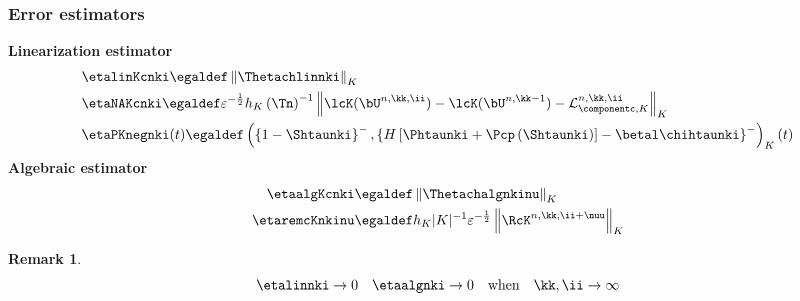\documentclass[10 pt]{beamer}
\newtheorem{remark}[theorem]{Remark}
\begin{document}
\begin{frame}
\frametitle{Error estimators}
\textcolor{cadmiumgreen}{\textbf{Linearization estimator}}
\begin{equation*}
\begin{split}
& \etalinKcnki \egaldef \left\|\Thetachlinnki \right\|_K\\
& \etaNAKcnki  \egaldef \varepsilon^{-\frac{1}{2}} h_K \left(\Tn\right)^{-1} \left\|\lcK(\bU^{n,\kk,\ii}) - \lcK(\bU^{n,\kk-1}) - \mathcal{L}_{\componentc,K}^{n,\kk,\ii} \right\|_K\\
& \etaPKnegnki(t)  \egaldef \left(\left\{1 - \Shtaunki\right\}^{-},\left\{H\left[\Phtaunki + \Pcp\left(\Shtaunki\right)\right]-\betal \chihtaunki\right\}^{-}\right)_K(t)
\end{split}
\end{equation*}
\pause
\textcolor{cadmiumgreen}{\textbf{Algebraic estimator}}
\begin{equation*}
\begin{split}
\etaalgKcnki & \egaldef \left\|\Thetachalgnkinu \right\|_K\\
\etaremcKnkinu & \egaldef h_K |K|^{-1} \varepsilon^{-\frac{1}{2}} \left\|\RcK^{n,\kk,\ii+\nuu}  \right\|_K
\end{split}
\end{equation*}
\pause
\begin{remark}
\begin{equation*}
\etalinnki \rightarrow 0 \quad \etaalgnki \rightarrow 0 \quad \mbox{when} \quad \kk,\ii \rightarrow \infty 
\end{equation*}

\end{remark}
\end{frame}
\end{document}
